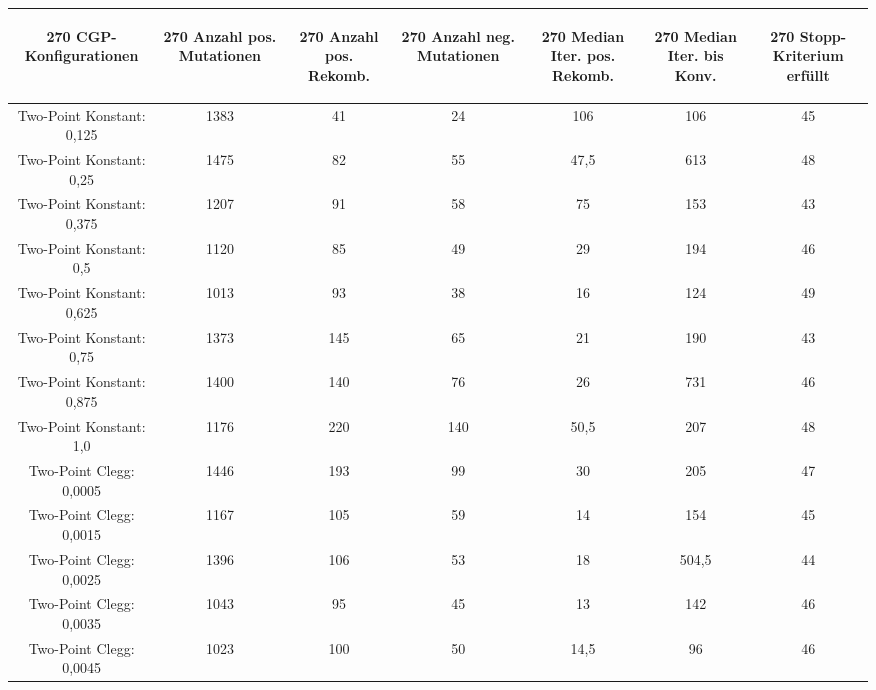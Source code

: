 \begin{table}[H]
	\centering
	\begin{tabular}{c | c | c | c | c | c | c}
		\begin{turn}{270} \textbf{CGP-Konfigurationen} \end{turn} & \begin{turn}{270} \textbf{Anzahl pos. Mutationen} \end{turn} & \begin{turn}{270} \textbf{Anzahl pos. Rekomb.} \end{turn} & \begin{turn}{270} \textbf{Anzahl neg. Mutationen} \end{turn} & \begin{turn}{270} \textbf{Median Iter. pos. Rekomb.} \end{turn} & \begin{turn}{270} \textbf{Median Iter. bis Konv.} \end{turn} & \begin{turn}{270} \textbf{Stopp-Kriterium erfüllt} \end{turn}\\
		\hline
		Two-Point Konstant: 0,125 & 1383 & 41 & 24 & 106 & 106 & 45\\
		\hline
		Two-Point Konstant: 0,25 & 1475 & 82 & 55 & 47,5 & 613 & 48\\
		\hline
		Two-Point Konstant: 0,375 & 1207 & 91 & 58 & 75 & 153 & 43\\
		\hline
		Two-Point Konstant: 0,5 & 1120 & 85 & 49 & 29 & 194 & 46\\
		\hline
		Two-Point Konstant: 0,625 & 1013 & 93 & 38 & 16 & 124 & 49\\
		\hline
		Two-Point Konstant: 0,75 & 1373 & 145 & 65 & 21 & 190 & 43\\
		\hline
		Two-Point Konstant: 0,875 & 1400 & 140 & 76 & 26 & 731 & 46\\
		\hline
		Two-Point Konstant: 1,0 & 1176 & 220 & 140 & 50,5 & 207 & 48\\
		\hline
		Two-Point Clegg: 0,0005 & 1446 & 193 & 99 & 30 & 205 & 47\\
		\hline
		Two-Point Clegg: 0,0015 & 1167 & 105 & 59 & 14 & 154 & 45\\
		\hline
		Two-Point Clegg: 0,0025 & 1396 & 106 & 53 & 18 & 504,5 & 44\\
		\hline
		Two-Point Clegg: 0,0035 & 1043 & 95 & 45 & 13 & 142 & 46\\
		\hline
		Two-Point Clegg: 0,0045 & 1023 & 100 & 50 & 14,5 & 96 & 46\\

\end{tabular}
\end{table}
